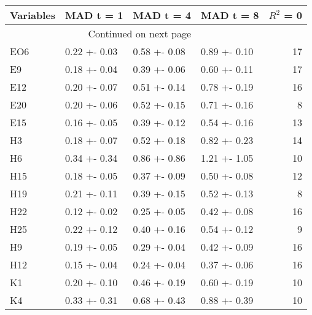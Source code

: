 \begin{longtable}{llllr}
\toprule
\textbf{Variables} & \textbf{MAD t = 1} & \textbf{MAD t = 4} & \textbf{MAD t = 8} &  \textbf{$R^2$ = 0} \\
\midrule
\endhead
\midrule
\multicolumn{3}{r}{{Continued on next page}} \\
\midrule
\endfoot

\bottomrule
\endlastfoot
               EO6 &       0.22 +- 0.03 &       0.58 +- 0.08 &       0.89 +- 0.10 &                  17 \\
                E9 &       0.18 +- 0.04 &       0.39 +- 0.06 &       0.60 +- 0.11 &                  17 \\
               E12 &       0.20 +- 0.07 &       0.51 +- 0.14 &       0.78 +- 0.19 &                  16 \\
               E20 &       0.20 +- 0.06 &       0.52 +- 0.15 &       0.71 +- 0.16 &                   8 \\
               E15 &       0.16 +- 0.05 &       0.39 +- 0.12 &       0.54 +- 0.16 &                  13 \\
                H3 &       0.18 +- 0.07 &       0.52 +- 0.18 &       0.82 +- 0.23 &                  14 \\
                H6 &       0.34 +- 0.34 &       0.86 +- 0.86 &       1.21 +- 1.05 &                  10 \\
               H15 &       0.18 +- 0.05 &       0.37 +- 0.09 &       0.50 +- 0.08 &                  12 \\
               H19 &       0.21 +- 0.11 &       0.39 +- 0.15 &       0.52 +- 0.13 &                   8 \\
               H22 &       0.12 +- 0.02 &       0.25 +- 0.05 &       0.42 +- 0.08 &                  16 \\
               H25 &       0.22 +- 0.12 &       0.40 +- 0.16 &       0.54 +- 0.12 &                   9 \\
                H9 &       0.19 +- 0.05 &       0.29 +- 0.04 &       0.42 +- 0.09 &                  16 \\
               H12 &       0.15 +- 0.04 &       0.24 +- 0.04 &       0.37 +- 0.06 &                  16 \\
                K1 &       0.20 +- 0.10 &       0.46 +- 0.19 &       0.60 +- 0.19 &                  10 \\
                K4 &       0.33 +- 0.31 &       0.68 +- 0.43 &       0.88 +- 0.39 &                  10 \\

\end{longtable}
